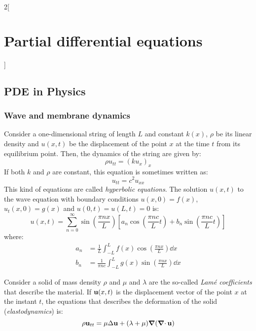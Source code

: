 \documentclass[../../../main_math.tex]{subfiles}
\begin{document}
\renewcommand{\col}{\apl}
\begin{multicols}{2}[\section{Partial differential equations}]
  \subsection{PDE in Physics}
  \subsubsection{Wave and membrane dynamics}
  \begin{proposition}
    Consider a one-dimensional string of length $L$ and constant $k(x)$, $\rho$ be its linear density and $u(x,t)$ be the displacement of the point $x$ at the time $t$ from its equilibrium point. Then, the dynamics of the string are given by: $$\rho u_{tt}={(ku_x)}_x$$ If both $k$ and $\rho$ are constant, this equation is sometimes written as:
    \begin{equation}\label{PDE_waveeq}
      u_{tt}=c^2u_{xx}
    \end{equation}
    This kind of equations are called \emph{hyperbolic equations}. The solution $u(x,t)$ to the wave equation with boundary conditions $u(x,0)=f(x)$, $u_t(x,0)=g(x)$ and $u(0,t)=u(L,t)=0$ is: $$u(x,t)=\sum_{n=0}^\infty \sin\left(\frac{\pi n x}{L}\right)\left[a_n\cos\left(\frac{\pi n c}{L}t\right)+ b_n\sin\left( \frac{\pi n c}{L}t\right)\right]$$ where:
    \begin{align*}
      a_n & =\frac{1}{L}\int_{-L}^Lf(x)\cos\left(\frac{\pi n x}{L}\right)\dd{x}       \\
      b_n & =\frac{1}{\pi n c}\int_{-L}^Lg(x)\sin\left(\frac{\pi n x}{L}\right)\dd{x}
    \end{align*}
  \end{proposition}
  \begin{proposition}
    Consider a solid of mass density $\rho$ and $\mu$ and $\lambda$ are the so-called \emph{Lamé coefficients} that describe the material. If $\boldsymbol{\mathrm{u}}(x,t)$ is the displacement vector of the point $x$ at the instant $t$, the equations that describes the deformation of the solid (\emph{elastodynamics}) is:
    $$\rho\boldsymbol{\mathrm{u}}_{tt}=\mu\Delta\boldsymbol{\mathrm{u}}+(\lambda+\mu)\grad(\operatorname{\boldsymbol{\mathrm{\nabla}}\cdot}{\boldsymbol{\mathrm{u}}})$$
  \end{proposition}

\end{multicols}
\end{document}
